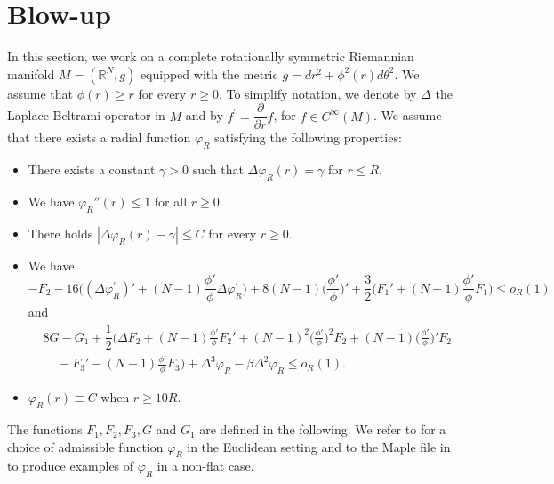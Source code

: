 \documentclass[10pt,leqno]{amsart}
\numberwithin{equation}{section}
\newcommand{\field}[1]{\mathbb{#1}}
\newcommand{\R}{\field{R}}          		%
\newcommand{\Sph}{\field{S}}        		%
\begin{document}
\section{Blow-up}
\label{secblowup}
In this section, we work on a complete rotationally symmetric Riemannian manifold $M=(\R^N,g)$ equipped with the metric $g =dr^2 +\phi^2(r) d\theta^2$. 
 We assume that $\phi(r)\ge r$ for every $r\ge 0$. To simplify notation, we denote by $\Delta$ the Laplace-Beltrami operator in $M$ and by $f^\prime= \dfrac{\partial}{\partial r}f$, for $f\in C^\infty (M)$. We assume that there exists a radial function $\varphi_R$ satisfying the following properties: 
\begin{itemize}
\item There exists a constant $\gamma>0$ such that
$\Delta \varphi_R (r)=\gamma$ for  $r\leq R$.
\item We have $\varphi_R'' (r) \leq 1$ for all $r\geq 0$.
\item There holds
$|\Delta \varphi_R (r) -\gamma| \leq C$ for every  $r\geq $0.
\item We have
$$ -F_2 - 16  \big((\Delta \varphi_R^\prime)' +(N-1)\frac{\phi'}{\phi} \Delta \varphi_R^\prime \big) +8(N-1)  \big(\frac{\phi'}{\phi}\big)' + \frac{3}{2} \big(F_1 ' + (N-1)\frac{\phi'}{\phi} F_1\big)  \leq o_R (1)$$
and
\begin{align*}
&8G -G_1 +\dfrac{1}{2} \big(\Delta F_2 +(N-1)\frac{\phi'}{\phi} F_2 ' +(N-1)^2 \big(\frac{\phi'}{\phi}\big)^2 F_2 + (N-1) \big(\frac{\phi'}{\phi}\big)' F_2\\
&\ \ \ \ \ - F_3 '- (N-1)\frac{\phi'}{\phi} F_3 \big)+\Delta^3 \varphi_R -\beta \Delta^2 \varphi_R \leq o_R (1).
\end{align*}
\item  $\varphi_R (r) \equiv C$ when $r\geq 10R$.
\end{itemize}
The functions $F_1,F_2,F_3,G$ and $G_1$ are defined in the following. We refer to \cite{bou-lenz} for a choice of admissible function $\varphi_R$ in the Euclidean setting and to the Maple file in \cite{maple} to produce examples of $\varphi_R$ in a non-flat case.
\end{document}
